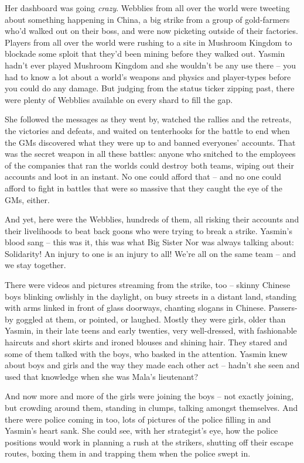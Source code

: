Her dashboard was going \emph{crazy}. Webblies from all over the
world were tweeting about something happening in China, a big
strike from a group of gold-farmers who'd walked out on their boss,
and were now picketing outside of their factories. Players from all
over the world were rushing to a site in Mushroom Kingdom to
blockade some sploit that they'd been mining before they walked
out. Yasmin hadn't ever played Mushroom Kingdom and she wouldn't be
any use there -- you had to know a lot about a world's weapons and
physics and player-types before you could do any damage. But
judging from the status ticker zipping past, there were plenty of
Webblies available on every shard to fill the gap.

She followed the messages as they went by, watched the rallies and
the retreats, the victories and defeats, and waited on tenterhooks
for the battle to end when the GMs discovered what they were up to
and banned everyones' accounts. That was the secret weapon in all
these battles: anyone who snitched to the employees of the
companies that ran the worlds could destroy both teams, wiping out
their accounts and loot in an instant. No one could afford that --
and no one could afford to fight in battles that were so massive
that they caught the eye of the GMs, either.

And yet, here were the Webblies, hundreds of them, all risking
their accounts and their livelihoods to beat back goons who were
trying to break a strike. Yasmin's blood sang -- this was it, this
was what Big Sister Nor was always talking about: Solidarity! An
injury to one is an injury to all! We're all on the same team --
and we stay together.

There were videos and pictures streaming from the strike, too --
skinny Chinese boys blinking owlishly in the daylight, on busy
streets in a distant land, standing with arms linked in front of
glass doorways, chanting slogans in Chinese. Passers-by goggled at
them, or pointed, or laughed. Mostly they were girls, older than
Yasmin, in their late teens and early twenties, very well-dressed,
with fashionable haircuts and short skirts and ironed blouses and
shining hair. They stared and some of them talked with the boys,
who basked in the attention. Yasmin knew about boys and girls and
the way they made each other act -- hadn't she seen and used that
knowledge when she was Mala's lieutenant?

And now more and more of the girls were joining the boys -- not
exactly joining, but crowding around them, standing in clumps,
talking amongst themselves. And there were police coming in too,
lots of pictures of the police filling in and Yasmin's heart sank.
She could see, with her strategist's eye, how the police positions
would work in planning a rush at the strikers, shutting off their
escape routes, boxing them in and trapping them when the police
swept in.

